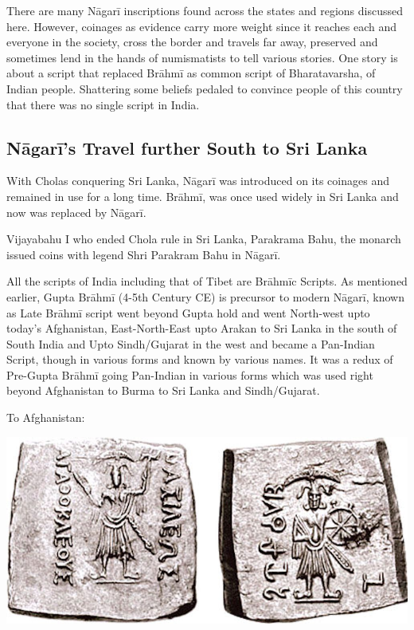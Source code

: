 There are many Nāgarī inscriptions found across the states and regions discussed here. However, coinages as evidence carry more weight since it reaches each and everyone in the society, cross the border and travels far away, preserved and sometimes lend in the hands of numismatists to tell various stories. One story is about a script that replaced Brāhmī as common script of Bharatavarsha, of Indian people. Shattering some beliefs pedaled to convince people of this country that there was no single script in India.


\subsection*{Nāgarī’s Travel further South to Sri Lanka}

With Cholas conquering Sri Lanka, Nāgarī was introduced on its coinages and remained in use for a long time. Brāhmī, was once used widely in Sri Lanka and now was replaced by Nāgarī.

Vijayabahu I who ended Chola rule in Sri Lanka, Parakrama Bahu, the monarch issued coins with legend Shri Parakram Bahu in Nāgarī.

All the scripts of India including that of Tibet are Brāhmīc Scripts. As mentioned earlier, Gupta Brāhmī (4-5th Century CE) is precursor to modern Nāgarī, known as Late Brāhmī script went beyond Gupta hold and went North-west upto today’s Afghanistan, East-North-East upto Arakan to Sri Lanka in the south of South India and Upto Sindh/Gujarat in the west and became a Pan-Indian Script, though in various forms and known by various names. It was a redux of Pre-Gupta Brāhmī going Pan-Indian in various forms which was used right beyond Afghanistan to Burma to Sri Lanka and Sindh/Gujarat.

To Afghanistan:

\vskip 5pt

\centerline{\includegraphics[scale=0.95]{"images/article-06/art06-fig24.jpg"}}

